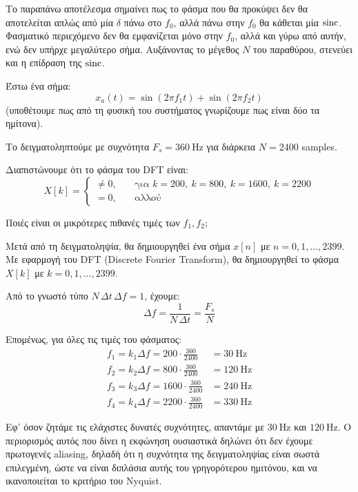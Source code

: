 \documentclass[11pt,a4paper,notitlepage,fleqn]{article}
\let\mytodo\todo
\renewcommand{\todo}[1]{\par\mytodo[inline,noline]{#1}}
\begin{document}
\todo{add a lot of graphs}
Το παραπάνω αποτέλεσμα σημαίνει πως το φάσμα που θα προκύψει δεν θα αποτελείται απλώς από μία \( δ \)
πάνω στο \( f_0 \), αλλά πάνω στην \( f_0 \) θα κάθεται μία \( \operatorname{sinc} \). Φασματικό περιεχόμενο δεν θα
εμφανίζεται μόνο στην \( f_0 \), αλλά και γύρω από αυτήν, ενώ δεν υπήρχε μεγαλύτερο σήμα. Αυξάνοντας
το μέγεθος \( N \) του παραθύρου, στενεύει και η επίδραση της \( \operatorname{sinc} \).

\begin{exercise}
	Έστω ένα σήμα:
	\[
	x_a(t) = \sin(2π f_1 t) + \sin(2π f_2 t)
	\]
	(υποθέτουμε πως από τη φυσική του συστήματος γνωρίζουμε πως είναι δύο τα ημίτονα).
	
	Το δειγματοληπτούμε με συχνότητα \( F_s = \SI{360}{\hertz} \) για διάρκεια
	\( N = 2400 \) samples.
	
	Διαπιστώνουμε ότι το φάσμα του DFT είναι:
	\[
	X[k] = \begin{cases}
	\neq 0,& \quad \text{για } k=200,\ k=800,\ k=1600,\ k=2200 \\
	= 0,&\quad \text{αλλού}
	\end{cases}
	\]
	
	Ποιές είναι οι μικρότερες πιθανές τιμές των \( f_1, f_2 \);
	
	\tcblower
	
	Μετά από τη δειγματοληψία, θα δημιουργηθεί ένα σήμα \( x[n] \) με \( n=0,1,\dots,2399 \). Με εφαρμογή
	του DFT (Discrete Fourier Transform), θα δημιουργηθεί το φάσμα \( X[k] \) με \( k=0,1,\dots,2399 \).
	
	Από το γνωστό τύπο \( N\, Δt\, Δf = 1 \), έχουμε:
	\[
	Δf = \frac{1}{Ν\,Δt}=\frac{F_s}{N}
	\]
	
	Επομένως, για όλες τις τιμές του φάσματος:
	\begin{align*}
		f_1 = k_1 Δf = 200 \cdot \frac{360}{2400} &= \SI{30}{\hertz}\\
		f_2 = k_2 Δf = 800 \cdot \frac{360}{2400} &= \SI{120}{\hertz}\\
		f_3 = k_3 Δf = 1600 \cdot \frac{360}{2400} &= \SI{240}{\hertz}\\
		f_4 = k_4 Δf = 2200 \cdot \frac{360}{2400} &= \SI{330}{\hertz}
	\end{align*}
	
	Εφ' όσον ζητάμε τις ελάχιστες δυνατές συχνότητες, απαντάμε με \( \SI{30}{\hertz} \) και \( \SI{120}{\hertz} \).
	Ο περιορισμός αυτός που δίνει η εκφώνηση ουσιαστικά δηλώνει ότι δεν έχουμε πρωτογενές aliasing, δηλαδή
	ότι η συχνότητα της δειγματοληψίας είναι σωστά επιλεγμένη, ώστε να είναι διπλάσια αυτής του
	γρηγορότερου ημιτόνου, και να ικανοποιείται το κριτήριο του Nyquist.
	

\end{exercise}
\end{document}
